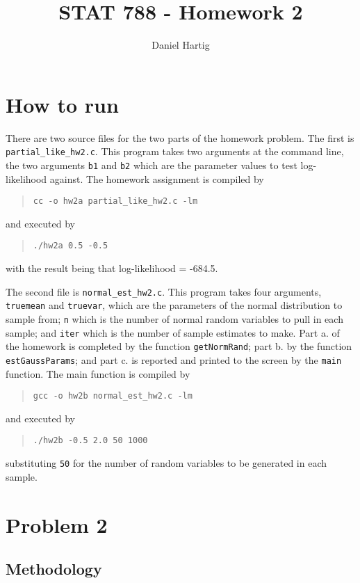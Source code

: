 \documentclass{article}
\title{STAT 788 - Homework 2}
\author{Daniel Hartig}
\begin{document}
\maketitle

\section{How to run}

There are two source files for the two parts of the homework problem. The first is \verb!partial_like_hw2.c!. This program takes two arguments at the command line, the two arguments \verb!b1! and \verb!b2! which are the parameter values to test log-likelihood against. The homework assignment is compiled by
\begin{quote}\verb!cc -o hw2a partial_like_hw2.c -lm!\end{quote}
and executed by 
\begin{quote}\verb!./hw2a 0.5 -0.5!\end{quote}
with the result being that log-likelihood = -684.5.

The second file is \verb!normal_est_hw2.c!. This program takes four arguments, \verb!truemean! and \verb!truevar!, which are the parameters of the normal distribution to sample from; \verb!n! which is the number of normal random variables to pull in each sample; and \verb!iter! which is the number of sample estimates to make. Part a. of the homework is completed by the function \verb!getNormRand!; part b. by the function \verb!estGaussParams!; and part c. is reported and printed to the screen by the \verb!main! function. The main function is compiled by 
\begin{quote}\verb!gcc -o hw2b normal_est_hw2.c -lm!\end{quote}

and executed by 
\begin{quote}\verb!./hw2b -0.5 2.0 50 1000!\end{quote}
substituting \verb!50! for the number of random variables to be generated in each sample.



\section{Problem 2}
\subsection{Methodology}
\end{document}
